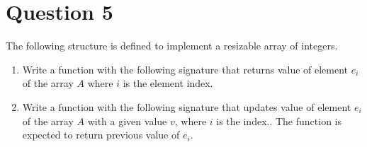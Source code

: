 
\section*{Question 5}

The following structure is defined to implement a resizable array of integers.

\lstset{language=c,tabsize=4}


\begin{enumerate}
\item Write a function with the following signature that returns value of element $e_{i}$ of the array $A$ where $i$ is the element index.



\item Write a function with the following signature that updates value of element $e_{i}$ of the array $A$ with a given value $v$, where $i$ is the index..
The function is expected to return previous value of $e_{i}$.


\end{enumerate}

